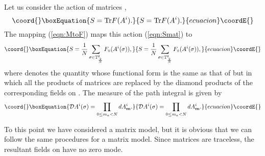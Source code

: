 \documentclass[12pt,a4paper]{article}
\providecommand{\ncpl}{{\mathbb T}^2_\frac{2}{N}}
\providecommand{\Tr}{\mbox{\rm Tr}}
\begin{document}
Let us consider the action of matrices \coordHE{},
\begin{equation}\coord{}\boxEquation{
	S= \Tr F(A^i). \label{eqn:Smat}
}{
	S= \Tr F(A^i). }{ecuacion}\coordE{}\end{equation}
The \myHighlight{$\Delta$}\coordHE{} mapping (\ref{eqn:MtoF}) maps this action (\ref{eqn:Smat})
to
\begin{equation}\coord{}\boxEquation{
	S={\frac{1}{N}}\sum_{\sigma\in\ncpl}F_\diamond(A^i(\sigma)),
\label{eqn:Sgen}
}{
	S={\frac{1}{N}}\sum_{\sigma\in\ncpl}F_\diamond(A^i(\sigma)),
}{ecuacion}\coordE{}\end{equation}
where \coordHE{} denotes the quantity whose functional form is
the same as that of \coordHE{} but in which all the products of
matrices are replaced by the diamond products of the corresponding
fields on \myHighlight{$\ncpl$}\coordHE{}.
The measure of the path integral is given by
\begin{equation}\coord{}\boxEquation{
	{\cal D}A^i(\sigma)=\prod_{0\leq m_a < N}dA^i_{\bf m}.
}{
	{\cal D}A^i(\sigma)=\prod_{0\leq m_a < N}dA^i_{\bf m}.
}{ecuacion}\coordE{}\end{equation}

To this point we have considered a \coordHE{} matrix model, but it is
obvious that we can follow the same procedures for a \coordHE{} matrix
model. Since matrices are traceless, the resultant fields on \myHighlight{$\ncpl$}\coordHE{}
have no zero mode.

\end{document}
